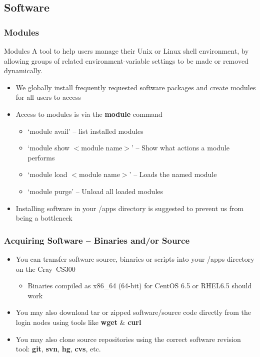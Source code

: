 \documentclass[t,hyperref={pdfpagelabels=false}]{beamer}
\newcommand{\ctilde}{{\fontfamily{ptm}\selectfont\texttildelow}}
\newcommand{\craycs}{Cray~CS300}
\begin{document}
\subsection{Software}
\begin{frame}
	\frametitle{Modules}
	\begin{block}{Modules}\tiny
	A tool to help users manage their Unix or Linux shell environment, by allowing groups of related environment-variable settings to be made or removed dynamically.\footnotemark
	
	\end{block}
	\begin{itemize}
		\item We globally install frequently requested software packages and create modules for all users to access
		\item Access to modules is via the \textbf{module} command
		\begin{itemize}\footnotesize
			\item `module avail' -- list installed modules
			\item `module show $<$module name$>$' -- Show what actions a module performs
			\item `module load $<$module name$>$' -- Loads the named module
			\item `module purge' -- Unload all loaded modules
		\end{itemize}
		\item Installing software in your \ctilde{}/apps directory is suggested to prevent us from being a bottleneck
	\end{itemize}
\end{frame}


\begin{frame}
	\frametitle{Acquiring Software -- Binaries and/or Source}
	\begin{itemize}
		\item	You can transfer software source, binaries or scripts into your \ctilde{}/apps directory on the {\craycs}
		\begin{itemize}
			\item Binaries compiled as x86\_64 (64-bit) for CentOS 6.5 or RHEL6.5 should work
		\end{itemize}
		\item You may also download tar or zipped software/source code directly from the login nodes using tools like \textbf{wget} \& \textbf{curl}
		\item You may also clone source repositories using the correct software revision tool: \textbf{git}, \textbf{svn}, \textbf{hg}, \textbf{cvs}, etc.
	\end{itemize}
\end{frame}
\end{document}
